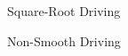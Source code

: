 \documentclass{beamer}
\begin{document}
\begin{frame}{Square-Root Driving}
\begin{adjustbox}{max totalsize={\textwidth}{\textheight}}

\end{adjustbox}
\end{frame}

\begin{frame}{Non-Smooth Driving}
\begin{adjustbox}{max totalsize={\textwidth}{\textheight}}

\end{adjustbox}
\end{frame}
\end{document}
